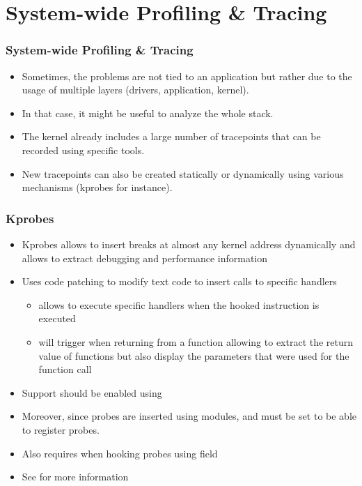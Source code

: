 \section{System-wide Profiling \& Tracing}

\begin{frame}
  \frametitle{System-wide Profiling \& Tracing}
  \begin{itemize}
    \item Sometimes, the problems are not tied to an application but rather
          due to the usage of multiple layers (drivers, application, kernel).
    \item In that case, it might be useful to analyze the whole stack.
    \item The kernel already includes a large number of tracepoints that can be
          recorded using specific tools.
    \item New tracepoints can also be created statically or dynamically using
          various mechanisms (kprobes for instance).
  \end{itemize}
\end{frame}

\begin{frame}[fragile]
  \frametitle{Kprobes}
  \begin{itemize}
    \item {Kprobes} allows to insert breaks at almost any kernel address
          dynamically and allows to extract debugging and performance
          information
    \item Uses code patching to modify text code to insert calls to specific
          handlers
    \begin{itemize}
      \item {} allows to execute specific handlers when the hooked
            instruction is executed
      \item {} will trigger when returning from a function allowing to
            extract the return value of functions but also display the
            parameters that were used for the function call
    \end{itemize}
    \item Support should be enabled using 
    \item Moreover, since probes are inserted using modules, 
    and  must be set to be able to
    register probes.
    \item Also requires  when hooking probes
          using  field
    \item See  for more information
  \end{itemize}
\end{frame}

